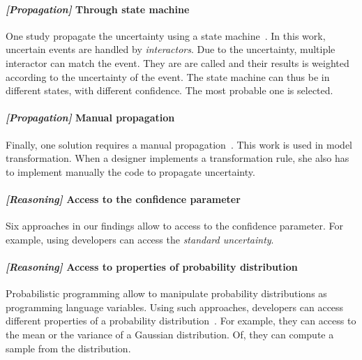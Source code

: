 \paragraph{\textit{[Propagation]} Through state machine}
One study propagate the uncertainty using a state machine~\cite{DBLP:conf/uist/SchwarzMH11}.
In this work, uncertain events are handled by \textit{interactors}.
Due to the uncertainty, multiple interactor can match the event.
They are are called and their results is weighted according to the uncertainty of the event.
The state machine can thus be in different states, with different confidence.
The most probable one is selected.

	
\paragraph{\textit{[Propagation]} Manual propagation}
Finally, one solution requires a manual propagation~\cite{DBLP:conf/models/BurguenoBMV18}.
This work is used in model transformation.
When a designer implements a transformation rule, she also has to implement manually the code to propagate uncertainty.
	
\paragraph{\textit{[Reasoning]} Access to the confidence parameter}
Six approaches in our findings allow to access to the confidence parameter.
For example, using  \cite{DBLP:conf/quatic/VallecilloMO16} developers can access the \textit{standard uncertainty}.
	
\paragraph{\textit{[Reasoning]} Access to properties of probability distribution}
Probabilistic programming allow to manipulate probability distributions as programming language variables.
Using such approaches, developers can access different properties of a probability distribution~\cite{baudin2017openturns, DBLP:conf/asplos/BornholtMM14, DBLP:journals/corr/BorgstromGGMG13, osti_1430202, DBLP:journals/peerj-cs/SalvatierWF16, DBLP:conf/popl/BhatAVG12, DBLP:conf/aistats/ChagantyNR13, DBLP:journals/siamsc/JaroszewiczK12, DBLP:journals/toplas/ParkPT08, DBLP:conf/ijcai/Pfeffer01, DBLP:conf/popl/RamseyP02, DBLP:conf/pldi/SankaranarayananCG13, DBLP:conf/icra/Thrun00, DBLP:journals/sac/LunnTBS00, plummer2003jags}.
For example, they can access to the mean or the variance of a Gaussian distribution.
Of, they can compute a sample from the distribution.
	
